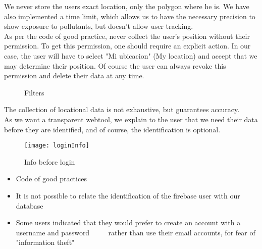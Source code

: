We never store the users exact location, only the polygon where he is.
We have also implemented a time limit, which allows us to have the necessary precision to show exposure to pollutants, but doesn't allow user tracking.\\

As per the code of good practice, never collect the user's position without their permission.
To get this permission, one should require an explicit action. In our case, the user will have to select "Mi ubicacion" (My location) and accept 
that we may determine their position. Of course the user can always revoke this permission and
delete their data at any time. \\

\begin{figure}[ht]
    \centering
    \hfill
    \caption{Filters}
\end{figure}

The collection of locational data is not exhaustive, but guarantees accuracy. \\

As we want a transparent webtool, we explain to the user that we need their data before
they are identified, and of course, the identification is optional. \\

\begin{figure}[ht]
    \centering
    \texttt{[image: loginInfo]}
    \caption{Info before login}
\end{figure}

\begin{itemize}
    \item Code of good practices
    \item It is not possible to relate the identification of the firebase user with our database
    \item Some users indicated that they would prefer to create an account with a username and password
          rather than use their email accounts, for fear of "information theft"
\end{itemize}